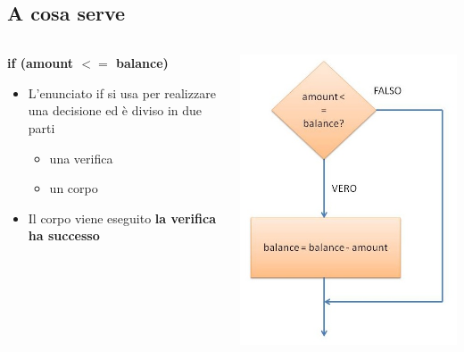 \subsection*{A cosa serve}
\begin{frame}
\begin{columns}
\begin{column}{.5\textwidth}
\begin{block}{}
\textbf{\alert{if (amount $<=$ balance)}}\\
\hfill{\textbf{}}
\end{block}
\begin{block}{}
\begin{itemize}
\item L'enunciato if si usa per realizzare una decisione ed è diviso in due parti
\begin{itemize}
\item una \alert{verifica}
\item un \alert{corpo}
\end{itemize}
\item Il corpo viene eseguito \textbf{ la verifica ha successo}
\end{itemize}
\end{block}
\end{column}
\begin{column}{.5\textwidth}
\includegraphics[width = \textwidth]{images/costruttoIf.jpg}
\end{column}
\end{columns}
\end{frame}

